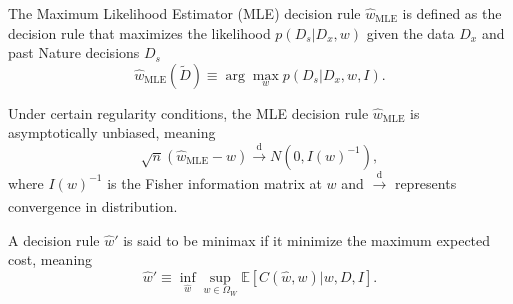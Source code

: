 \begin{definition}
	\label{def:MLE}
	The Maximum Likelihood Estimator (MLE) decision rule $\hat{w}_{\text{MLE}}$ is defined as the decision rule that maximizes the likelihood $p(D_s|D_x,w)$ given the data $D_x$ and past Nature decisions $D_s$
	\begin{equation}
		\hat{w}_{\text{MLE}}(\tilde{D}) \equiv \arg \max_{w} p(D_s|D_x,w,I).
	\end{equation}
\end{definition}

\begin{theorem}
	\label{thm:unbiased_mle}
	Under certain regularity conditions, the MLE decision rule $\hat{w}_{\text{MLE}}$ is asymptotically unbiased, meaning
	\begin{equation}
		\sqrt{n}(\hat{w}_{\text{MLE}}-w)\xrightarrow[]{\text{d}} N(0,I(w)^{-1}),
	\end{equation}
	where $I(w)^{-1}$ is the Fisher information matrix at $w$ and $\xrightarrow[]{\text{d}}$ represents convergence in distribution.
\end{theorem}

\begin{definition}
	\label{def:minimax}
	A decision rule $\hat{w}'$ is said to be minimax if it minimize the maximum expected cost, meaning
	\begin{equation}
		\hat{w}' \equiv \inf_{\hat{w}}\sup_{w\in \Omega_W}\mathbb{E}[C(\hat{w},w)|w,D,I].
	\end{equation}
\end{definition}

